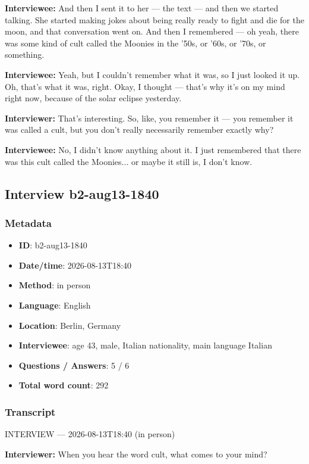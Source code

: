 \textbf{Interviewee:} And then I sent it to her — the text — and then we started talking. She started making jokes about being really ready to fight and die for the moon, and that conversation went on. And then I remembered — oh yeah, there was some kind of cult called the Moonies in the '50s, or '60s, or '70s, or something.

\textbf{Interviewee:} Yeah, but I couldn't remember what it was, so I just looked it up. Oh, that's what it was, right. Okay, I thought — that's why it's on my mind right now, because of the solar eclipse yesterday.

\textbf{Interviewer:} That's interesting. So, like, you remember it — you remember it was called a cult, but you don't really necessarily remember exactly why?

\textbf{Interviewee:} No, I didn't know anything about it. I just remembered that there was this cult called the Moonies... or maybe it still is, I don't know.

\subsection{Interview b2-aug13-1840}\label{int:b2-aug13-1840}
\subsubsection*{Metadata}
\begin{itemize}
  \item \textbf{ID}: b2-aug13-1840
  \item \textbf{Date/time}: 2026-08-13T18:40
  \item \textbf{Method}: in person
  \item \textbf{Language}: English
  \item \textbf{Location}: Berlin, Germany
  \item \textbf{Interviewee}: age 43, male, Italian nationality, main language Italian
  \item \textbf{Questions / Answers}: 5 / 6
  \item \textbf{Total word count}: 292
\end{itemize}
\subsubsection*{Transcript}
INTERVIEW — 2026-08-13T18:40 (in person)

\textbf{Interviewer:} When you hear the word cult, what comes to your mind?

